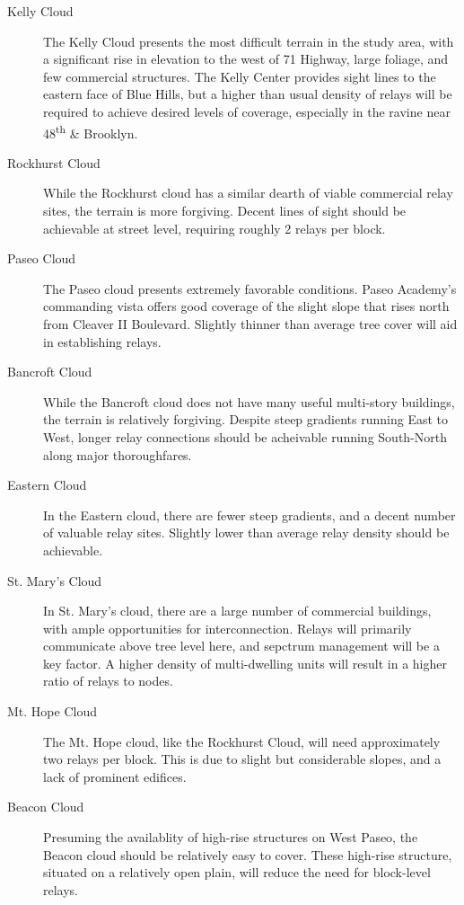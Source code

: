 \begin{description}
\item[Kelly Cloud] The Kelly Cloud presents the most difficult terrain in the study
area, with a significant rise in elevation to the west of 71 Highway, large foliage,
and few commercial structures. The Kelly Center provides sight lines to the eastern
face of Blue Hills, but a higher than usual density of relays will be required to 
achieve desired levels of coverage, especially in the ravine near 48\textsuperscript{th}
\& Brooklyn.
\item[Rockhurst Cloud] While the Rockhurst cloud has a similar dearth of viable commercial
relay sites, the terrain is more forgiving. Decent lines of sight should be achievable at
street level, requiring roughly 2 relays per block.
\item[Paseo Cloud] The Paseo cloud presents extremely favorable conditions. Paseo Academy's
commanding vista offers good coverage of the slight slope that rises north from Cleaver II Boulevard.
Slightly thinner than average tree cover will aid in establishing relays. 
\item[Bancroft Cloud] While the Bancroft cloud does not have many useful multi-story buildings,
the terrain is relatively forgiving. Despite steep gradients running East to West, longer relay
connections should be acheivable running South-North along major thoroughfares.
\item[Eastern Cloud] In the Eastern cloud, there are fewer steep gradients, and a decent number
of valuable relay sites. Slightly lower than average relay density should be achievable.
\item[St. Mary's Cloud] In St. Mary's cloud, there are a large number of commercial buildings,
with ample opportunities for interconnection. Relays will primarily communicate above tree level
here, and sepctrum management will be a key factor. A higher density of multi-dwelling units will
result in a higher ratio of relays to nodes.
\item[Mt. Hope Cloud] The Mt. Hope cloud, like the Rockhurst Cloud, will need approximately two
relays per block. This is due to slight but considerable slopes, and a lack of prominent edifices.
\item[Beacon Cloud] Presuming the availablity of high-rise structures on West Paseo, the Beacon cloud
should be relatively easy to cover. These high-rise structure, situated on a relatively open plain,
will reduce the need for block-level relays.
\end{description}

